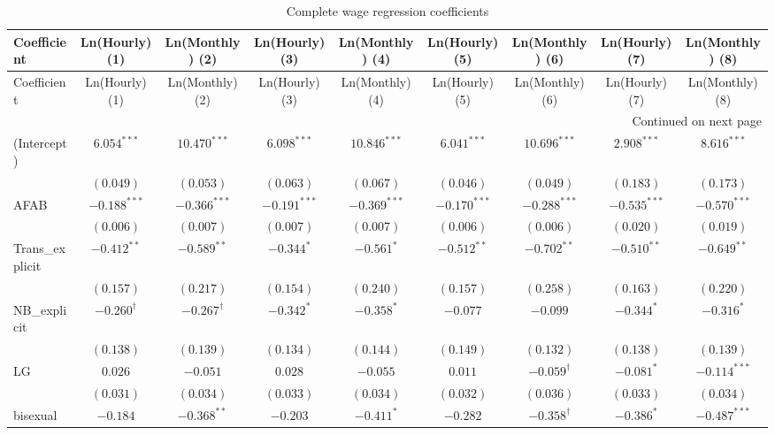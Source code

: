 \begin{landscape}
\begingroup
\scriptsize
\setlength{\tabcolsep}{3pt}
\begin{longtable}{lcccccccc}
\caption{Complete wage regression coefficients}\label{tab:wages_trans_nb_full} \\
\hline
Coefficient & Ln(Hourly) (1) & Ln(Monthly) (2) & Ln(Hourly) (3) & Ln(Monthly) (4) & Ln(Hourly) (5) & Ln(Monthly) (6) & Ln(Hourly) (7) & Ln(Monthly) (8) \\
\hline
\endfirsthead
\hline
Coefficient & Ln(Hourly) (1) & Ln(Monthly) (2) & Ln(Hourly) (3) & Ln(Monthly) (4) & Ln(Hourly) (5) & Ln(Monthly) (6) & Ln(Hourly) (7) & Ln(Monthly) (8) \\
\hline
\endhead
\hline
\multicolumn{9}{r}{Continued on next page} \\
\endfoot
\hline
\endlastfoot
(Intercept) & $6.054^{***}$ & $10.470^{***}$ & $6.098^{***}$ & $10.846^{***}$ & $6.041^{***}$ & $10.696^{***}$ & $2.908^{***}$ & $8.616^{***}$ \\
 & $(0.049)$ & $(0.053)$ & $(0.063)$ & $(0.067)$ & $(0.046)$ & $(0.049)$ & $(0.183)$ & $(0.173)$ \\
AFAB & $-0.188^{***}$ & $-0.366^{***}$ & $-0.191^{***}$ & $-0.369^{***}$ & $-0.170^{***}$ & $-0.288^{***}$ & $-0.535^{***}$ & $-0.570^{***}$ \\
 & $(0.006)$ & $(0.007)$ & $(0.007)$ & $(0.007)$ & $(0.006)$ & $(0.006)$ & $(0.020)$ & $(0.019)$ \\
Trans\_explicit & $-0.412^{**}$ & $-0.589^{**}$ & $-0.344^{*}$ & $-0.561^{*}$ & $-0.512^{**}$ & $-0.702^{**}$ & $-0.510^{**}$ & $-0.649^{**}$ \\
 & $(0.157)$ & $(0.217)$ & $(0.154)$ & $(0.240)$ & $(0.157)$ & $(0.258)$ & $(0.163)$ & $(0.220)$ \\
NB\_explicit & $-0.260^{\dagger}$ & $-0.267^{\dagger}$ & $-0.342^{*}$ & $-0.358^{*}$ & $-0.077$ & $-0.099$ & $-0.344^{*}$ & $-0.316^{*}$ \\
 & $(0.138)$ & $(0.139)$ & $(0.134)$ & $(0.144)$ & $(0.149)$ & $(0.132)$ & $(0.138)$ & $(0.139)$ \\
LG & $0.026$ & $-0.051$ & $0.028$ & $-0.055$ & $0.011$ & $-0.059^{\dagger}$ & $-0.081^{*}$ & $-0.114^{***}$ \\
 & $(0.031)$ & $(0.034)$ & $(0.033)$ & $(0.034)$ & $(0.032)$ & $(0.036)$ & $(0.033)$ & $(0.034)$ \\
bisexual & $-0.184$ & $-0.368^{**}$ & $-0.203$ & $-0.411^{*}$ & $-0.282$ & $-0.358^{\dagger}$ & $-0.386^{*}$ & $-0.487^{***}$ \\

\end{longtable}
\end{landscape}
